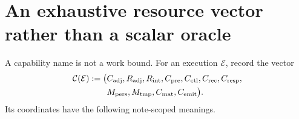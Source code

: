 \section{An exhaustive resource vector rather than a scalar oracle}
\label{sec:resource-vector}

A capability name is not a work bound.  For an execution $\mathcal E$, record
the vector
\begin{equation}
 \begin{aligned}
 \mathcal C(\mathcal E):=\bigl(&
 C_{\rm adj},R_{\rm adj},R_{\rm int},C_{\rm pre},C_{\rm ctl},
 C_{\rm rec},C_{\rm resp},\\
 &M_{\rm pers},M_{\rm tmp},C_{\rm mat},C_{\rm emit}
 \bigr).
 \end{aligned}
 \label{eq:resource-vector}
\end{equation}
Its coordinates have the following note-scoped meanings.

